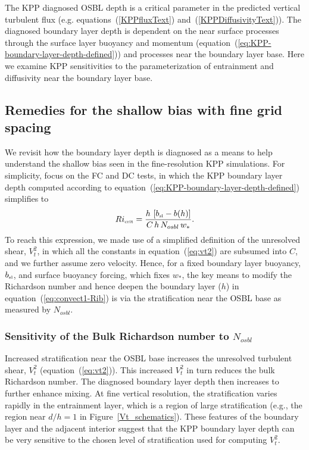 \documentclass[preprint,12pt,authoryear]{agujournal}
\begin{document}
The KPP diagnosed OSBL depth is a critical parameter in the predicted vertical turbulent flux (e.g. equations~(\ref{KPPfluxText}) and~(\ref{KPPDiffusivityText})).  The diagnosed boundary layer depth is dependent on the near surface processes through the surface layer buoyancy and momentum (equation~(\ref{eq:KPP-boundary-layer-depth-defined})) and processes near the boundary layer base.  Here we examine KPP sensitivities to the parameterization of entrainment and diffusivity near the boundary layer base.

\subsection{Remedies for the shallow bias with fine grid spacing}

We revisit how the boundary layer depth is diagnosed as a means to help understand the shallow bias seen in the fine-resolution KPP simulations. For simplicity, focus on the FC and DC tests, in which the KPP boundary layer depth computed according to equation~(\ref{eq:KPP-boundary-layer-depth-defined}) simplifies to
\begin{equation}
\label{eq:convect1-Rib}
Ri_{\mbox{\tiny crit}} = \frac{h \, \left[b_{\tiny \mbox{sl}} - b(h) \right]}{C \, h \, N_{osbl} \, w_*}.
\end{equation}
To reach this expression, we made use of a simplified definition of the unresolved shear, $V_t^2$, in which all the constants in equation~(\ref{eq:vt2}) are subsumed into $C$, and we further assume zero velocity. Hence, for a fixed boundary layer buoyancy, $b_{\tiny \mbox{sl}}$, and surface buoyancy forcing, which fixes $w_*$, the key means to modify the Richardson number and hence deepen the boundary layer ($h$) in equation~(\ref{eq:convect1-Rib}) is via the stratification near the OSBL base as measured by $N_{osbl}$.

\subsubsection{Sensitivity of the Bulk Richardson number to $N_{osbl}$}

Increased stratification near the OSBL base increases the unresolved turbulent shear, $V_t^2$ (equation~(\ref{eq:vt2})). This increased $V_t^2$ in turn reduces the bulk Richardson number. The diagnosed boundary layer depth then increases to further enhance mixing. At fine vertical resolution, the stratification varies rapidly in the entrainment layer, which is a region of large stratification (e.g., the region near $d/h=1$ in Figure~\ref{Vt_schematics}).  These features of the boundary layer and the adjacent interior suggest that the KPP boundary layer depth can be very sensitive to the chosen level of stratification used for computing $V_t^2$.
\end{document}
